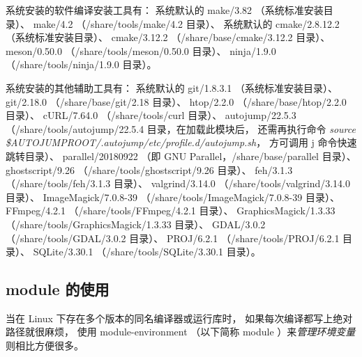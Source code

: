 \documentclass[UTF8]{ctexart}
\begin{document}
系统安装的软件编译安装工具有：\newline
系统默认的 make/3.82 （系统标准安装目录）、\newline
make/4.2 （/share/tools/make/4.2 目录）、\newline
系统默认的 cmake/2.8.12.2 （系统标准安装目录）、\newline
cmake/3.12.2 （/share/base/cmake/3.12.2 目录）、\newline
meson/0.50.0 （/share/tools/meson/0.50.0 目录）、\newline
ninja/1.9.0 （/share/tools/ninja/1.9.0 目录）。
\bigskip

系统安装的其他辅助工具有：\newline
系统默认的 git/1.8.3.1 （系统标准安装目录）、\newline
git/2.18.0 （/share/base/git/2.18 目录）、\newline
htop/2.2.0 （/share/base/htop/2.2.0 目录）、\newline
cURL/7.64.0 （/share/tools/curl 目录）、\newline
autojump/22.5.3 （/share/tools/autojump/22.5.4 目录，在加载此模块后，
还需再执行命令 {\em source \$AUTOJUMPROOT/.autojump/etc/profile.d/autojump.sh}，
方可调用 j 命令快速跳转目录）、\newline
parallel/20180922 （即 GNU Parallel，/share/base/parallel 目录）、\newline
ghostscript/9.26 （/share/tools/ghostscript/9.26 目录）、\newline
feh/3.1.3 （/share/tools/feh/3.1.3 目录）、\newline
valgrind/3.14.0 （/share/tools/valgrind/3.14.0 目录）、\newline
ImageMagick/7.0.8-39 （/share/tools/ImageMagick/7.0.8-39 目录）、\newline
FFmpeg/4.2.1 （/share/tools/FFmpeg/4.2.1 目录）、\newline
GraphicsMagick/1.3.33 （/share/tools/GraphicsMagick/1.3.33 目录）、\newline
GDAL/3.0.2 （/share/tools/GDAL/3.0.2 目录）、\newline
PROJ/6.2.1 （/share/tools/PROJ/6.2.1 目录）、\newline
SQLite/3.30.1 （/share/tools/SQLite/3.30.1 目录）。

\subsection{module 的使用}
当在 Linux 下存在多个版本的同名编译器或运行库时，
如果每次编译都写上绝对路径就很麻烦，
使用 module-environment （以下简称 module ）来{\em 管理环境变量}则相比方便很多。
\end{document}
